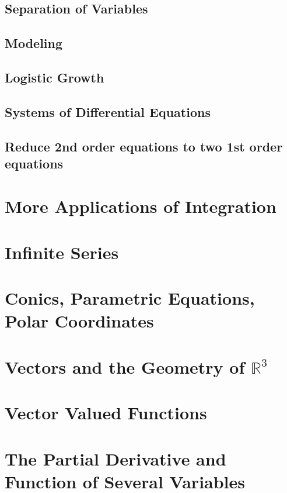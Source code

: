 \documentclass{amsbook}
\begin{document}
\section{Separation of Variables}

\section{Modeling}

\section{Logistic Growth}

\section{Systems of Differential Equations}

\section{Reduce 2nd order equations to two 1st order equations}



\chapter{More Applications of Integration}


\chapter{Infinite Series}

\chapter{Conics, Parametric Equations, Polar Coordinates}

\chapter{Vectors and the Geometry of $\mathbb{R}^3$}

\chapter{Vector Valued Functions}

\chapter{The Partial Derivative and Function of Several Variables}
\end{document}
